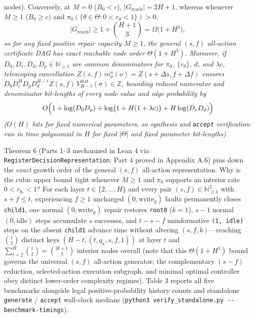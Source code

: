 \documentclass[11pt,letterpaper]{article}
\begin{document}
\begin{enumerate}
{  nodes). Conversely, at \(M = 0\) (\(B_0 < c\)),
  \(|G_{\mathrm{reach}}| = 2H + 1\), whereas whenever \(M \ge 1\)
  (\(B_0 \ge c\)) and
  \(\pi_0(\{\theta \in \Theta : 0 < r_\theta < 1\}) > 0\),}
  \[|G_{\mathrm{reach}}| \ge 1 + \binom{H + 1}{3} = \Omega\bigl(1 + H^3\bigr),\]
  \emph{so for any fixed positive repair capacity \(M \ge 1\), the
  general \((s, f)\) all-action certificate DAG has exact reachable node
  order \(\Theta(1 + H^3)\). Moreover, if
  \(D_0, D_r, D_d, D_p \in \mathbb{N}_{\ge 1}\) are common denominators
  for \(\pi_0\), \(\{r_\theta\}\), \(d\), and \(\lambda c\), telescoping
  cancellation \(Z(s,f)\,m_\sigma^a(o) = Z(s + \Delta s, f + \Delta f)\)
  ensures
  \(D_0 D_r^H D_p D_d^{H-t} Z(s,f)\,V_{H-t}^{\mathrm{stat}}(\sigma) \in \mathbb{Z}\),
  bounding reduced numerator and denominator bit-lengths of every node
  value and edge probability by}
  \[O\Bigl(1 + \log(D_0 D_p) + \log\bigl(1 + H(1 + \lambda c)\bigr) + H\log(D_r D_d)\Bigr)\]
  \emph{(\(O(H)\) bits for fixed numerical parameters, so synthesis and
  \texttt{accept} verification run in time polynomial in \(H\) for fixed
  \(|\Theta|\) and fixed parameter bit-lengths).}
\end{enumerate}

Theorem 6 (Parts 1--3 mechanized in Lean 4 via
\texttt{RegisterDecisionRepresentation}; Part 4 proved in Appendix A.6)
pins down the \emph{exact} growth order of the general \((s,f)\)
all-action representation. Why is the cubic upper bound tight whenever
\(M \ge 1\) and \(\pi_0\) supports an interior rate
\(0 < r_{\theta_*} < 1\)? For each layer \(t \in \{2, \dots, H\}\) and
every pair \((s, f) \in \mathbb{N}_{\ge 1}^2\) with \(s + f \le t\),
experiencing \(f \ge 1\) uncharged \((0, \mathrm{write}_g)\) faults
permanently closes \texttt{child1}, one normal \((0, \mathrm{write}_g)\)
repair restores \texttt{root0} (\(k = 1\)), \(s - 1\) normal
\((0, \mathrm{idle})\) steps accumulate \(s\) successes, and
\(t - s - f\) uninformative \texttt{(1,\ idle)} steps on the absent
\texttt{child1} advance time without altering \((s, f, k)\)---reaching
\(\binom{t}{2}\) distinct keys \((H - t, (t, q_\star, s, f, 1))\) at
layer \(t\) and \(\sum_{t=2}^H \binom{t}{2} = \binom{H+1}{3}\) interior
nodes overall (note that this \(\Theta(1 + H^3)\) bound governs the
universal \((s,f)\) all-action generator; the complementary \((s - f)\)
reduction, selected-action execution subgraph, and minimal optimal
controller obey distinct lower-order complexity regimes). Table 3
reports all five benchmarks alongside legal positive-probability history
counts and standalone \texttt{generate} / \texttt{accept} wall-clock
medians
(\texttt{python3\ verify\_standalone.py\ -\/-benchmark-timings}).
\end{document}
